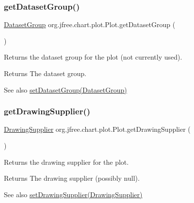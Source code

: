 \subsubsection{\texorpdfstring{get\+Dataset\+Group()}{getDatasetGroup()}}
{\footnotesize\ttfamily \mbox{\hyperlink{classorg_1_1jfree_1_1data_1_1general_1_1_dataset_group}{Dataset\+Group}} org.\+jfree.\+chart.\+plot.\+Plot.\+get\+Dataset\+Group (\begin{DoxyParamCaption}{ }\end{DoxyParamCaption})}

Returns the dataset group for the plot (not currently used).

\begin{DoxyReturn}{Returns}
The dataset group.
\end{DoxyReturn}
\begin{DoxySeeAlso}{See also}
\mbox{\hyperlink{classorg_1_1jfree_1_1chart_1_1plot_1_1_plot_a519687029156c44ed1874e3b4cf43122}{set\+Dataset\+Group(\+Dataset\+Group)}} 
\end{DoxySeeAlso}
\mbox{\label{classorg_1_1jfree_1_1chart_1_1plot_1_1_plot_a371e21293523674a59d87c9d62ffff15}} 
\subsubsection{\texorpdfstring{get\+Drawing\+Supplier()}{getDrawingSupplier()}}
{\footnotesize\ttfamily \mbox{\hyperlink{interfaceorg_1_1jfree_1_1chart_1_1plot_1_1_drawing_supplier}{Drawing\+Supplier}} org.\+jfree.\+chart.\+plot.\+Plot.\+get\+Drawing\+Supplier (\begin{DoxyParamCaption}{ }\end{DoxyParamCaption})}

Returns the drawing supplier for the plot.

\begin{DoxyReturn}{Returns}
The drawing supplier (possibly {\ttfamily null}).
\end{DoxyReturn}
\begin{DoxySeeAlso}{See also}
\mbox{\hyperlink{classorg_1_1jfree_1_1chart_1_1plot_1_1_plot_a079267deccd4488e8110f2ce847d01a5}{set\+Drawing\+Supplier(\+Drawing\+Supplier)}} 
\end{DoxySeeAlso}
\mbox{\label{classorg_1_1jfree_1_1chart_1_1plot_1_1_plot_a1ce9b4391819a9e5ff7e50d16c649fdd}} 
